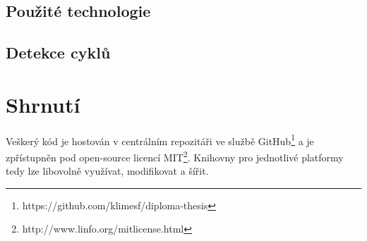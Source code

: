 \subsection{Použité technologie}

\subsection{Detekce cyklů}

\section{Shrnutí}

Veškerý kód je hostován v centrálním repozitáři
ve službě GitHub\footnote{
https://github.com/klimesf/diploma-thesis
} a je zpřístupněn pod open-source licencí MIT\footnote{
http://www.linfo.org/mitlicense.html
}. Knihovny pro jednotlivé platformy tedy lze libovolně
využívat, modifikovat a šířit.
